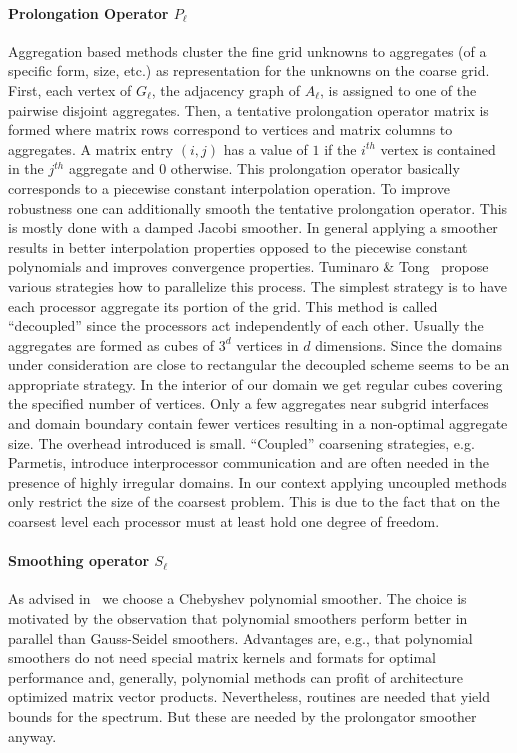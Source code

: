 \documentclass[a4paper,10pt,3p,final,pdftex]{elsarticle}
\begin{document}
\paragraph{Prolongation Operator $P_\ell$} Aggregation based methods
cluster the fine grid unknowns to aggregates (of a specific form, size,
etc.) as representation for the unknowns on the coarse grid.  First,
each vertex of $G_\ell$, the adjacency graph of $A_\ell$, is assigned to
one of the pairwise disjoint aggregates.  Then, a tentative prolongation
operator matrix is formed where matrix rows correspond to vertices and
matrix columns to aggregates.  A matrix entry $(i,j)$ has a value of $1$
if the $i^{th}$ vertex is contained in the $j^{th}$ aggregate and $0$
otherwise.  This prolongation operator basically corresponds to a
piecewise constant interpolation operation.  To improve robustness one
can additionally smooth the tentative prolongation operator. This is
mostly done with a damped Jacobi smoother.  In general applying a
smoother results in better interpolation properties opposed to the
piecewise constant polynomials and improves convergence properties.
Tuminaro \& Tong~\cite{tuto:00} propose various strategies how to
parallelize this process.  The simplest strategy is to have each
processor aggregate its portion of the grid.  This method is called
``decoupled'' since the processors act independently of each other.
Usually the aggregates are formed as cubes of $3^d$ vertices in $d$
dimensions.  Since the domains under consideration are close to
rectangular the decoupled scheme seems to be an appropriate strategy.
In the interior of our domain we get regular cubes covering the
specified number of vertices.  Only a few aggregates near subgrid
interfaces and domain boundary contain fewer vertices resulting in a
non-optimal aggregate size.  The overhead introduced is small. 
``Coupled'' coarsening strategies, e.g. Parmetis, introduce interprocessor
communication and are often needed in the presence of highly irregular
domains.  In our context applying uncoupled methods only restrict the size
of the coarsest problem.  This is due to the fact that on the coarsest
level each processor must at least hold one degree of freedom.

\paragraph{Smoothing operator $S_\ell$} As advised in~\cite{abht:03} we
choose a Chebyshev polynomial smoother.  The choice is motivated by the
observation that polynomial smoothers perform better in parallel than
Gauss-Seidel smoothers.  Advantages are, e.g., that polynomial smoothers
do not need special matrix kernels and formats for optimal performance
and, generally, polynomial methods can profit of architecture optimized
matrix vector products.  Nevertheless, routines are needed that yield
bounds for the spectrum.  But these are needed by the prolongator
smoother anyway.
\end{document}
